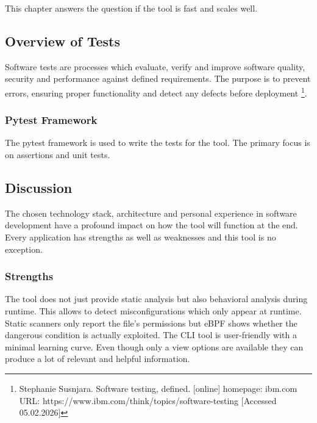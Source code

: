 This chapter answers the question if the tool is fast and scales well.

\subsection{Overview of Tests}

Software tests are processes which evaluate, verify and improve software quality, security and performance against defined requirements. The purpose is  to prevent errors, ensuring proper functionality and detect any defects before deployment \footnote{Stephanie Susnjara. Software testing, defined. [online] homepage: ibm.com URL: https://www.ibm.com/think/topics/software-testing [Accessed 05.02.2026]}.

\subsubsection{Pytest Framework}

The pytest framework is used to write the tests for the tool. The primary focus is on assertions and unit tests.



\subsection{Discussion}

The chosen technology stack, architecture and personal experience in software development have a profound impact on how the tool will function at the end. Every application has strengths as well as weaknesses and this tool is no exception.

\subsubsection{Strengths}

The tool does not just provide static analysis but also behavioral analysis during runtime. This allows to detect misconfigurations which only appear at runtime. Static scanners only report the file's permissions but eBPF shows whether the dangerous condition is actually exploited. \newline The CLI tool is user-friendly with a minimal learning curve. Even though only a view options are available they can produce a lot of relevant and helpful information.

